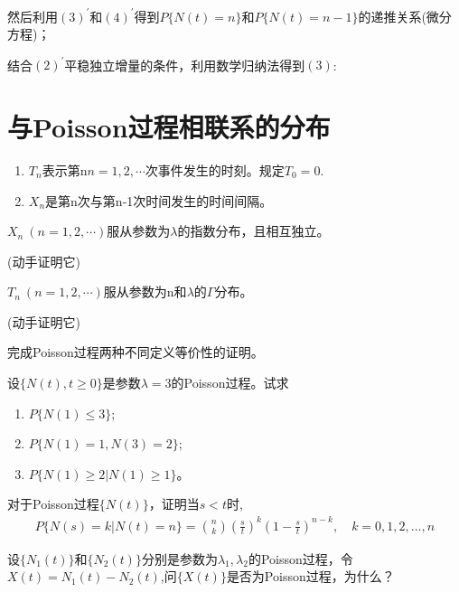 然后利用\((3)^{\prime}\)和\((4)^{\prime}\)得到\(P\{N(t)=n\}\)和\(P\{N(t)=n-1\}\)的递推关系(微分方程)；

\vspace{13em}

结合\((2)^{\prime}\)平稳独立增量的条件，利用数学归纳法得到\((3)\):

\vspace{13em}

\newpage

\section{与Poisson过程相联系的分布}

\begin{definition}\label{def:Tn-Xn}
	\begin{enumerate}[\bfseries (1)]
		\item \emph{\(T_n\)}表示第n\(n=1,2,\cdots\)次事件发生的时刻。规定\(T_0=0\).
		\item \emph{\(X_n\)}是第n次与第n-1次时间发生的时间间隔。
	\end{enumerate}
\end{definition}

\begin{theorem}\label{prop:Xn}
	\(X_n\ (n=1,2,\cdots)\)服从参数为\(\lambda\)的指数分布，且相互独立。
\end{theorem}

(动手证明它)

\newpage
\begin{theorem}\label{prop:Tn}
	\(T_n\ (n=1,2,\cdots)\)服从参数为n和\(\lambda\)的\(\Gamma\)分布。
\end{theorem}

(动手证明它)

\newpage

\vspace{10em}

\begin{Exercises}
	\item 完成Poisson过程两种不同定义等价性的证明。
	\item 设\(\{N(t),t\geqslant0\}\)是参数\(\lambda=3\)的Poisson过程。试求
	\begin{enumerate}[\bfseries (1)]
		\item \(P\{N(1)\leqslant3\}\);
		\item \(P\{N(1)=1,N(3)=2\}\);
		\item \(P\{N(1)\geqslant2|N(1)\geqslant1\}\)。
	\end{enumerate}
	\vspace{20em}
	\item 对于Poisson过程\(\{N(t)\}\)，证明当\(s<t\)时,
	\begin{align*}
		P\{N(s)=k|N(t)=n\}={n\choose k}\left(\frac{s}{t}\right)^k\left(1-\frac{s}{t}\right)^{n-k},\quad k=0,1,2,\ldots,n
	\end{align*}
	\newpage
	\item 设\(\{N_1(t)\}\)和\(\{N_2(t)\}\)分别是参数为\(\lambda_1,\lambda_2\)的Poisson过程，令\(X(t)=N_1(t)-N_2(t)\),问\(\{X(t)\}\)是否为Poisson过程，为什么？
\end{Exercises}